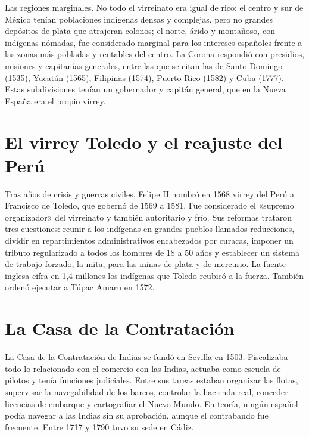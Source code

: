 \documentclass{book}
\begin{document}
Las regiones marginales. No todo el virreinato era igual de rico: el centro y sur de México tenían poblaciones indígenas densas y complejas, pero no grandes depósitos de plata que atrajeran colonos; el norte, árido y montañoso, con indígenas nómadas, fue considerado marginal para los intereses españoles frente a las zonas más pobladas y rentables del centro. La Corona respondió con presidios, misiones y capitanías generales, entre las que se citan las de Santo Domingo (1535), Yucatán (1565), Filipinas (1574), Puerto Rico (1582) y Cuba (1777). Estas subdivisiones tenían un gobernador y capitán general, que en la Nueva España era el propio virrey.


\section{El virrey Toledo y el reajuste del Perú}

Tras años de crisis y guerras civiles, Felipe II nombró en 1568 virrey del Perú a Francisco de Toledo, que gobernó de 1569 a 1581. Fue considerado el «supremo organizador» del virreinato y también autoritario y frío. Sus reformas trataron tres cuestiones: reunir a los indígenas en grandes pueblos llamados reducciones, dividir en repartimientos administrativos encabezados por curacas, imponer un tributo regularizado a todos los hombres de 18 a 50 años y establecer un sistema de trabajo forzado, la mita, para las minas de plata y de mercurio. La fuente inglesa cifra en 1,4 millones los indígenas que Toledo reubicó a la fuerza. También ordenó ejecutar a Túpac Amaru en 1572.


\section{La Casa de la Contratación}

La Casa de la Contratación de Indias se fundó en Sevilla en 1503. Fiscalizaba todo lo relacionado con el comercio con las Indias, actuaba como escuela de pilotos y tenía funciones judiciales. Entre sus tareas estaban organizar las flotas, supervisar la navegabilidad de los barcos, controlar la hacienda real, conceder licencias de embarque y cartografiar el Nuevo Mundo. En teoría, ningún español podía navegar a las Indias sin su aprobación, aunque el contrabando fue frecuente. Entre 1717 y 1790 tuvo su sede en Cádiz.
\end{document}
